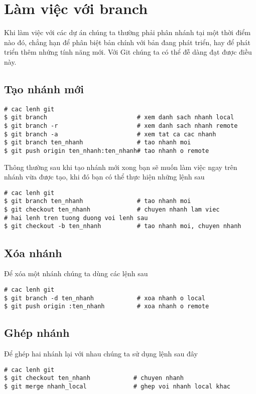 \documentclass[12pt]{article}
\begin{document}
\section{Làm việc với branch}
Khi làm việc với các dự án chúng ta thường phải phân nhánh tại một thời điểm nào đó, chẳng hạn để phân biệt bản chính với bản đang phát triển, hay để phát triển thêm nhứng tính năng mới. Với Git chúng ta có thể đễ dàng đạt được điều này. 
\subsection{Tạo nhánh mới}
\begin{lstlisting}[label=tao-nhanh-create-branch,caption=Tạo nhánh]
# cac lenh git
$ git branch                         # xem danh sach nhanh local
$ git branch -r                      # xem danh sach nhanh remote
$ git branch -a                      # xem tat ca cac nhanh
$ git branch ten_nhanh               # tao nhanh moi
$ git push origin ten_nhanh:ten_nhanh# tao nhanh o remote
\end{lstlisting}

Thông thường sau khi tạo nhánh mới xong bạn sẽ muốn làm việc ngay trên nhánh vừa được tạo, khi đó bạn có thể thực hiện những lệnh sau
\begin{lstlisting}[label=tao-nhanh-create-branch-short,caption=Tạo nhánh tắt]
# cac lenh git
$ git branch ten_nhanh               # tao nhanh moi
$ git checkout ten_nhanh             # chuyen nhanh lam viec
# hai lenh tren tuong duong voi lenh sau
$ git checkout -b ten_nhanh          # tao nhanh moi, chuyen nhanh
\end{lstlisting}


\subsection{Xóa nhánh}
Để xóa một nhánh chúng ta dùng các lệnh sau
\begin{lstlisting}[label=xoa-nhanh-delete-branch,caption=Xóa nhánh]
# cac lenh git
$ git branch -d ten_nhanh            # xoa nhanh o local
$ git push origin :ten_nhanh         # xoa nhanh o remote
\end{lstlisting}

\subsection{Ghép nhánh}
Để ghép hai nhánh lại với nhau chúng ta sử dụng lệnh sau đây
\begin{lstlisting}[label=ghep-nhanh-merge-local-branch,caption=Ghép nhánh local]
# cac lenh git
$ git checkout ten_nhanh            # chuyen nhanh
$ git merge nhanh_local             # ghep voi nhanh local khac
\end{lstlisting}
\end{document}
